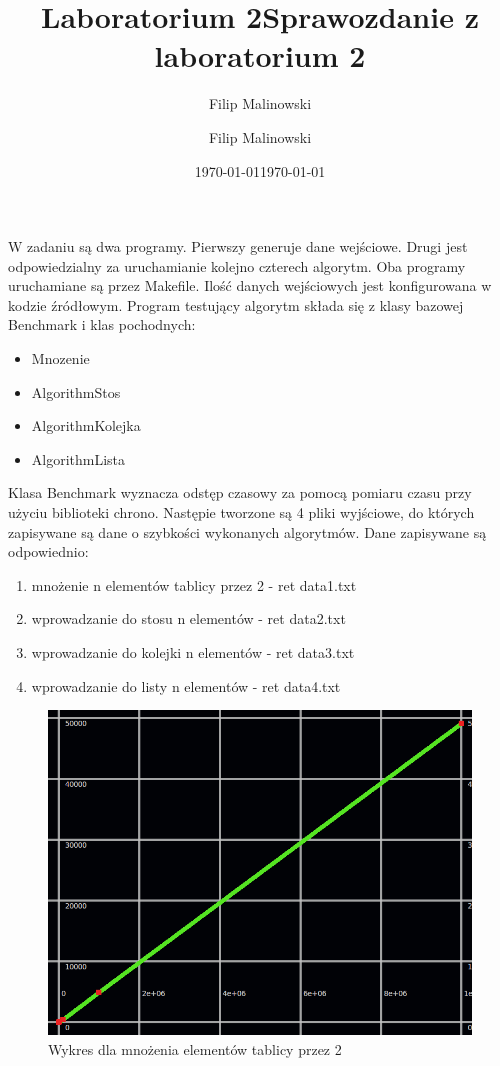 \documentclass[a4paper,10pt]{scrartcl}
\title{Laboratorium 2}
\author{Filip Malinowski}
\date{\today}
\begin{document}
\title{Sprawozdanie z laboratorium 2}
\author{Filip Malinowski}
\date{\today}

\maketitle

W zadaniu są dwa programy. Pierwszy generuje dane wejściowe.
Drugi jest odpowiedzialny za uruchamianie kolejno czterech
algorytm. Oba programy uruchamiane są przez Makefile.
Ilość danych wejściowych jest konfigurowana w kodzie źródłowym.
Program testujący algorytm składa się z klasy bazowej
Benchmark i klas pochodnych:
\begin{itemize}
 \item Mnozenie
 \item AlgorithmStos
 \item AlgorithmKolejka
 \item AlgorithmLista
\end{itemize}

Klasa Benchmark wyznacza odstęp czasowy za pomocą pomiaru czasu
przy użyciu biblioteki chrono. Następie tworzone są 4 pliki
wyjściowe, do których zapisywane są dane o szybkości wykonanych
algorytmów. Dane zapisywane są odpowiednio:
\begin{enumerate}
 \item mnożenie n elementów tablicy przez 2 - ret data1.txt
 \item wprowadzanie do stosu n elementów - ret data2.txt
 \item wprowadzanie do kolejki n elementów - ret data3.txt
 \item wprowadzanie do listy n elementów - ret data4.txt
\end{enumerate}

\begin{figure}
 \centering
  \includegraphics[scale=0.4]{ret_data1}
 \caption{Wykres dla mnożenia elementów tablicy przez 2}
\end{figure}
\end{document}
